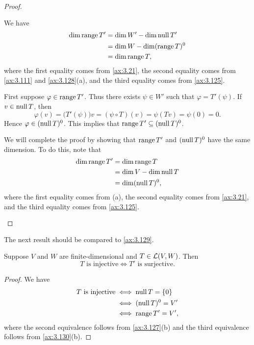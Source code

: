 \begin{proof}\leavevmode
\begin{parts}
\item We have
  \begin{align*}
  \operatorname{dim}\operatorname{range} T' &= \operatorname{dim} W'-\operatorname{dim}\operatorname{null} T'\\
                &= \operatorname{dim} W-\operatorname{dim}(\operatorname{range} T)^0\\
                &= \operatorname{dim}\operatorname{range} T,
  \end{align*}
  where the first equality comes from \ref{ax:3.21}, the second equality comes
  from \ref{ax:3.111} and \ref{ax:3.128}(a), and the third equality comes from
  \ref{ax:3.125}.
\item First suppose $\varphi\in\operatorname{range} T'$. Thus there exists $\psi\in W'$ such
  that $\varphi=T'(\psi)$. If $v\in\operatorname{null} T$, then
  \[ \varphi(v) = \bigl(T'(\psi)\bigr)v = (\psi\circ T)(v) = \psi(Tv)
     = \psi(0) = 0. \]
  Hence $\varphi\in(\operatorname{null} T)^0$. This implies that $\operatorname{range} T'\subseteq(\operatorname{null} T)^0$.

  We will complete the proof by showing that $\operatorname{range} T'$ and $(\operatorname{null} T)^0$ have
  the same dimension. To do this, note that
  \begin{align*}
  \operatorname{dim}\operatorname{range} T' &= \operatorname{dim}\operatorname{range} T\\
                &= \operatorname{dim} V-\operatorname{dim}\operatorname{null} T\\
                &= \operatorname{dim}(\operatorname{null} T)^0,
  \end{align*}
  where the first equality comes from (a), the second equality comes from
  \ref{ax:3.21}, and the third equality comes from \ref{ax:3.125}. \qedhere
\end{parts}
\end{proof}

The next result should be compared to \ref{ax:3.129}.

\begin{result}\label{ax:3.131}
Suppose $V$ and $W$ are finite-dimensional and $T\in\mathcal{L}(V,W)$. Then
\[ T \text{ is injective} \iff T' \text{ is surjective}. \]
\end{result}

\begin{proof}
We have
\begin{align*}
T\text{ is injective} &\iff \operatorname{null} T=\{0\}\\
  &\iff (\operatorname{null} T)^0=V'\\
  &\iff \operatorname{range} T'=V',
\end{align*}
where the second equivalence follows from \ref{ax:3.127}(b) and the third
equivalence follows from \ref{ax:3.130}(b).
\end{proof}

